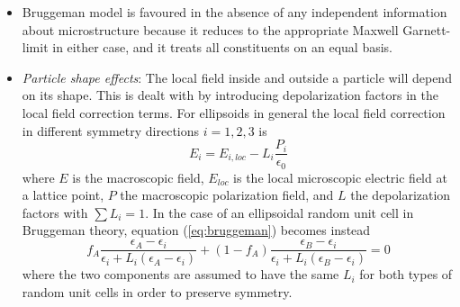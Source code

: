 \begin{itemize}
    \item Bruggeman model is favoured in the absence of any independent information about microstructure because it reduces to the appropriate Maxwell Garnett-limit in either case, and it treats all constituents on an equal basis.
    
    \item \emph{Particle shape effects}: The local field inside and outside a particle will depend on its shape. This is dealt with by introducing depolarization factors in the local field correction terms. For ellipsoids in general the local field correction in different symmetry directions $i = 1,2,3$ is
    \begin{equation}
        E_i = E_{i,loc} - L_i \frac{P_i}{\epsilon_0}
    \end{equation}
    where $E$ is the macroscopic field, $E_{loc}$ is the local microscopic electric field at a lattice point, $P$ the macroscopic polarization field, and $L$ the depolarization factors with $\sum L_i = 1$. In the case of an ellipsoidal random unit cell in Bruggeman theory, equation (\ref{eq:bruggeman}) becomes instead
    \begin{equation}
        f_A \frac{\epsilon_A - \epsilon_i}{\epsilon_i + L_i (\epsilon_A - \epsilon_i)} + (1-f_A) \frac{\epsilon_B - \epsilon_i}{\epsilon_i + L_i (\epsilon_B - \epsilon_i)} = 0
    \end{equation}
    where the two components are assumed to have the same $L_i$ for both types of random unit cells in order to preserve symmetry.
\end{itemize}

\cleardoublepage